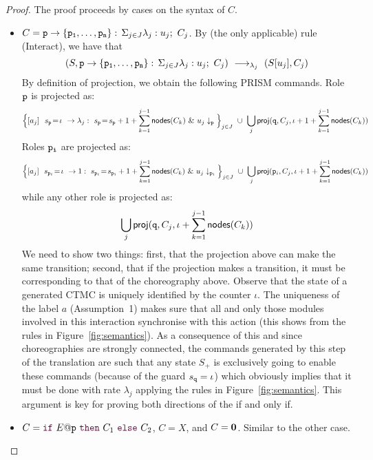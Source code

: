 \begin{proof}
  The proof proceeds by cases on the syntax of $C$.
  \begin{itemize}
  \item $C=\mathtt{p}\rightarrow \{\mathtt{\mathtt{p}_1,\ldots,\mathtt{p}_n}\}:\,\Sigma_{j\in J}\lambda_j: u_j;\ C_j$.  By (the only
    applicable) rule \textsf{(Interact)}, we have that
    \[
      (S, \mathtt{p}\rightarrow \{\mathtt{\mathtt{p}_1,\ldots,\mathtt{p}_n}\}:\,\Sigma_{j\in J}\lambda_j: u_j;\ C_j)
      \ \longrightarrow_{\lambda_j}\  (S[u_j], C_j) 
    \]
    By definition of projection, we obtain the following PRISM
    commands. Role $\mathtt{p}$ is projected as:
    \[
      \Big\{\commandBase {a_j} {\ s_{\role p}\!=\! \iota} {\lambda_j:\ s_{\role p}\!=\!
        s_{\role p} +1+\sum_{k=1}^{j-1}\mathsf{nodes}({C_k})}\ \&\ \projE
      {u_j}{\role p}\Big\}_{j\in J}
      \ \cup\ \bigcup_{j} \proj (\role q, C_j,
      \iota+1+\sum_{k=1}^{j-1}\mathsf{nodes}({C_k}))
    \]
    Roles $\mathtt{p_i}$ are projected as:
    \[
      \Big\{\commandBase {a_j} {\ s_{\role p_i}\!=\! \iota} {1:\ s_{\role p_i}\!=\!
        s_{\role p_i} +1+\sum_{k=1}^{j-1}\mathsf{nodes}({C_k})}\ \&\ 
       \projE{u_j}{\role p_i}\Big\}_{j\in J}
      \ \cup\ \bigcup_{j} \proj (\role p_i, C_j, \iota+1+\sum_{k=1}^{j-1}\mathsf{nodes}({C_k}))
    \]
    while any other role is projected as: 
    \[\bigcup_{j} \mathsf{proj} (\mathtt{q}, C_j, \iota+\sum_{k=1}^{j-1}\mathsf{nodes}({C_k}))
    \]
    We need to show two things: first, that the projection above can
    make the same transition; second, that if the projection makes a
    transition, it must be corresponding to that of the choreography
    above.
    Observe that the state of a generated CTMC is uniquely identified
    by the counter $\iota$.  The uniqueness of the label $a$
    (Assumption~1) makes sure that all and only those modules involved
    in this interaction synchronise with this action (this shows from
    the rules in Figure~\ref{fig:semantics}).  As a consequence of
    this and since choreographies are strongly connected, the commands
    generated by this step of the translation are such that any state
    $S_+$ is exclusively going to enable these commands (because of
    the guard $s_{\mathtt{q}}=\iota$) which obviously implies that it
    must be done with rate $\lambda_j$ applying the rules in
    Figure~\ref{fig:semantics}. This argument is key for proving both
    directions of the if and only if.

  \item $C=\ifTE {E}{p}{C_1}{C_2}$, $C=X$, and $C=\mathbf{0}$. Similar to
      the other case.
  \end{itemize}



\end{proof}
